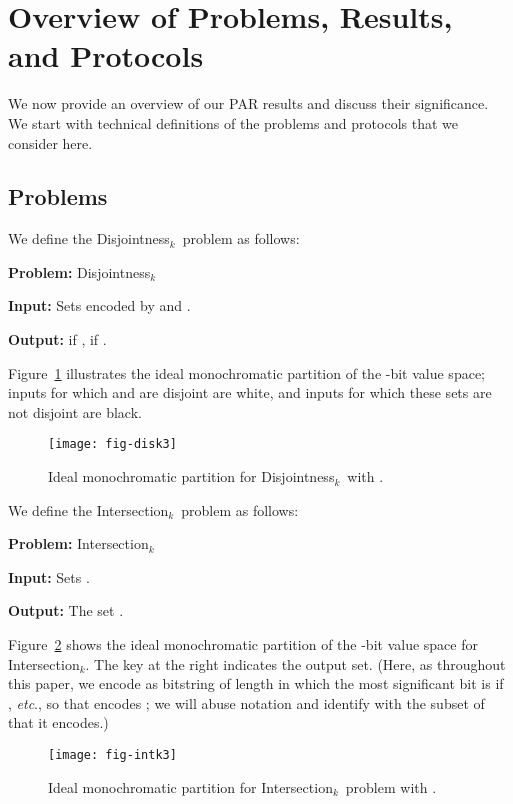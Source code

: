 \documentclass{article}
\theoremstyle{theorem}
\theoremstyle{definition}
\theoremstyle{remark}
\newcommand{\etc}{\emph{etc}}
\newcommand{\disjoint}{{\sc Dis\-joint\-ness}\ensuremath{_k}}
\newcommand{\intersection}{{\sc In\-ter\-sec\-tion}\ensuremath{_k}}
\begin{document}
\section{Overview of Problems, Results, and Protocols}\label{sec:overview}

We now provide an overview of our PAR results and discuss their significance.  We start with technical definitions of the problems and protocols that we consider here.

\subsection{Problems}

We define the \disjoint\ problem as follows:

\noindent\textbf{Problem:} \disjoint

\noindent\textbf{Input:} Sets  encoded by  and .

\noindent\textbf{Output:}  if ,  if .

Figure~\ref{fig:disk3} illustrates the ideal monochromatic partition of the -bit value space; inputs for which  and  are disjoint are white, and inputs for which these sets are not disjoint are black.
\begin{figure}[htp]
\begin{center}
\texttt{[image: fig-disk3]}
\caption{Ideal monochromatic partition for \disjoint\ with .}\label{fig:disk3}
\end{center}
\end{figure}


We define the \intersection\ problem as follows:

\noindent\textbf{Problem:} \intersection

\noindent\textbf{Input:} Sets .

\noindent\textbf{Output:} The set .

Figure~\ref{fig:intk3} shows the ideal monochromatic partition of the -bit value space for \intersection.  The key at the right indicates the output set.  (Here, as throughout this paper, we encode  as bitstring of length  in which the most significant bit is  if , \etc., so that  encodes ; we will abuse notation and identify  with the subset of  that it encodes.)
\begin{figure}[htp]
\begin{center}
\texttt{[image: fig-intk3]}
\end{center}
\caption{Ideal monochromatic partition for \intersection\ problem with .}\label{fig:intk3}
\end{figure}
\end{document}
